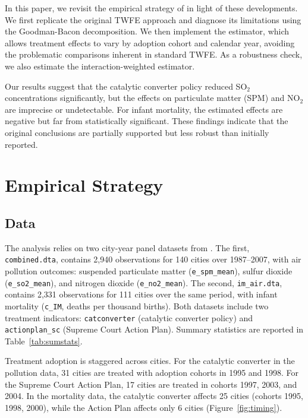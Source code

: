 \documentclass[10pt]{article}
\begin{document}
In this paper, we revisit the empirical strategy of \citet{greenstone2014} in light of these developments. We first replicate the original TWFE approach and diagnose its limitations using the Goodman-Bacon decomposition. We then implement the \citet{callaway2021} estimator, which allows treatment effects to vary by adoption cohort and calendar year, avoiding the problematic comparisons inherent in standard TWFE. As a robustness check, we also estimate the \citet{sunab2021} interaction-weighted estimator.

Our results suggest that the catalytic converter policy reduced SO$_2$ concentrations significantly, but the effects on particulate matter (SPM) and NO$_2$ are imprecise or undetectable. For infant mortality, the estimated effects are negative but far from statistically significant. These findings indicate that the original conclusions are partially supported but less robust than initially reported.

\section{Empirical Strategy}

\subsection{Data}

The analysis relies on two city-year panel datasets from \citet{greenstone2014}. The first, \texttt{combined.dta}, contains 2,940 observations for 140 cities over 1987--2007, with air pollution outcomes: suspended particulate matter (\texttt{e\_spm\_mean}), sulfur dioxide (\texttt{e\_so2\_mean}), and nitrogen dioxide (\texttt{e\_no2\_mean}). The second, \texttt{im\_air.dta}, contains 2,331 observations for 111 cities over the same period, with infant mortality (\texttt{c\_IM}, deaths per thousand births). Both datasets include two treatment indicators: \texttt{catconverter} (catalytic converter policy) and \texttt{actionplan\_sc} (Supreme Court Action Plan). Summary statistics are reported in Table~\ref{tab:sumstats}.

Treatment adoption is staggered across cities. For the catalytic converter in the pollution data, 31 cities are treated with adoption cohorts in 1995 and 1998. For the Supreme Court Action Plan, 17 cities are treated in cohorts 1997, 2003, and 2004. In the mortality data, the catalytic converter affects 25 cities (cohorts 1995, 1998, 2000), while the Action Plan affects only 6 cities (Figure~\ref{fig:timing}).
\end{document}
